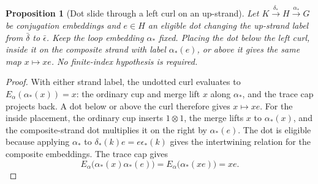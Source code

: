 \documentclass[11pt,a4paper]{article}
\numberwithin{equation}{section}
\newtheorem{proposition}[theorem]{Proposition}
\theoremstyle{definition}
\begin{document}
\begin{proposition}[Dot slide through a left curl on an up-strand]
\label{prop:left-curl-dot-slide-up}
Let \(K\xrightarrow{\delta_*}H\xrightarrow{\alpha_*}G\) be
conjugation embeddings and \(e\in H\) an eligible dot changing the
up-strand label from \(\bar\delta\) to \(\bar\epsilon\). Keep the
loop embedding \(\alpha_*\) fixed. Placing the dot below the left
curl, inside it on the composite strand with label \(\alpha_*(e)\),
or above it gives the same map \(x\mapsto xe\). No finite-index
hypothesis is required.
\end{proposition}

\begin{center}
\begin{minipage}{.98\linewidth}
\centering
{}
\end{minipage}
\end{center}

\begin{proof}
With either strand label, the undotted curl evaluates to
\(E_\alpha(\alpha_*(x))=x\): the ordinary cup and merge lift \(x\)
along \(\alpha_*\), and the trace cap projects back. A dot below or
above the curl therefore gives \(x\mapsto xe\). For the inside placement, the ordinary cup
inserts \(1\otimes1\), the merge lifts \(x\) to \(\alpha_*(x)\),
and the composite-strand dot multiplies it on the right by
\(\alpha_*(e)\). The dot is eligible because applying \(\alpha_*\)
to \(\delta_*(k)e=e\epsilon_*(k)\) gives the intertwining relation
for the composite embeddings. The trace cap gives
\[
 E_\alpha\bigl(\alpha_*(x)\alpha_*(e)\bigr)
    =E_\alpha\bigl(\alpha_*(xe)\bigr)=xe.
\]
\end{proof}
\end{document}

